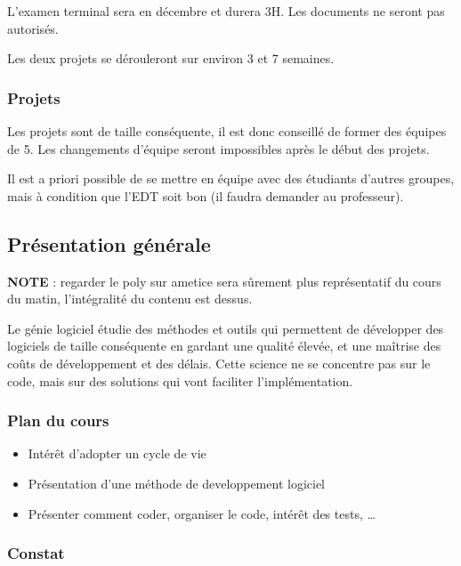 L'examen terminal sera en décembre et durera 3H. Les documents ne seront
pas autorisés.

Les deux projets se dérouleront sur environ 3 et 7 semaines.

\hypertarget{projets}{%
\subsubsection{Projets}\label{projets}}

Les projets sont de taille conséquente, il est donc conseillé de former
des équipes de 5. Les changements d'équipe seront impossibles après le
début des projets.

Il est a priori possible de se mettre en équipe avec des étudiants
d'autres groupes, mais à condition que l'EDT soit bon (il faudra
demander au professeur).

\hypertarget{pruxe9sentation-guxe9nuxe9rale}{%
\subsection{Présentation
générale}\label{pruxe9sentation-guxe9nuxe9rale}}

\textbf{NOTE} : regarder le poly sur ametice sera sûrement plus
représentatif du cours du matin, l'intégralité du contenu est dessus.

Le génie logiciel étudie des méthodes et outils qui permettent de
développer des logiciels de taille conséquente en gardant une qualité
élevée, et une maîtrise des coûts de développement et des délais. Cette
science ne se concentre pas sur le code, mais sur des solutions qui vont
faciliter l'implémentation.

\hypertarget{plan-du-cours}{%
\subsubsection{Plan du cours}\label{plan-du-cours}}

\begin{itemize}
\tightlist
\item
  Intérêt d'adopter un cycle de vie
\item
  Présentation d'une méthode de developpement logiciel
\item
  Présenter comment coder, organiser le code, intérêt des tests, \ldots{}
\end{itemize}

\hypertarget{constat}{%
\subsubsection{Constat}\label{constat}}

